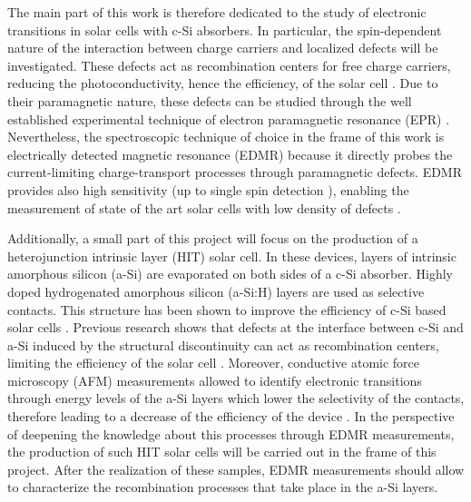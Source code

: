 \documentclass[a4paper]{book}
\begin{document}
	The main part of this work is therefore dedicated to the study of electronic transitions in solar cells with c-Si absorbers. In particular, the spin-dependent nature of the interaction between charge carriers and localized defects will be investigated. These defects act as recombination centers for free charge carriers, reducing the photoconductivity, hence the efficiency, of the solar cell \cite{moserChargeTransportAmorphous2019}. Due to their paramagnetic nature, these defects can be studied through the well established experimental technique of electron paramagnetic resonance (EPR) \cite{meyerAtomicStructureLightinduced2021}\cite{lenahanWhatCanElectron1998}. Nevertheless, the spectroscopic technique of choice in the frame of this work is electrically detected magnetic resonance (EDMR) because it directly probes the current-limiting charge-transport processes through paramagnetic defects. EDMR provides also high sensitivity (up to single spin detection \cite{xiaoElectricalDetectionSpin2004}), enabling the measurement of state of the art solar cells with low density of defects \cite{schneggPulsedElectricallyDetected2012}. \par
	
	Additionally, a small part of this project will focus on the production of a heterojunction intrinsic layer (HIT) solar cell. In these devices, layers of intrinsic amorphous silicon (a-Si) are evaporated on both sides of a c-Si absorber. Highly doped hydrogenated amorphous silicon (a-Si:H) layers are used as selective contacts. This structure has been shown to improve the efficiency of c-Si based solar cells \cite{taguchiHITTMCellsHighefficiency2000}.
	Previous research shows that defects at the interface between c-Si and a-Si induced by the structural discontinuity can act as recombination centers, limiting the efficiency of the solar cell \cite{georgeAtomicStructureInterface2013}.
	Moreover, conductive atomic force microscopy (AFM) measurements allowed to identify electronic transitions through energy levels of the a-Si layers which lower the selectivity of the contacts, therefore leading to a decrease of the efficiency of the device \cite{teferiImagingBandtailStates2021}. In the perspective of deepening the knowledge about this processes through EDMR measurements, the production of such HIT solar cells will be carried out in the frame of this project. After the realization of these samples, EDMR measurements should allow to characterize the recombination processes that take place in the a-Si layers.
	\\
	
\end{document}
